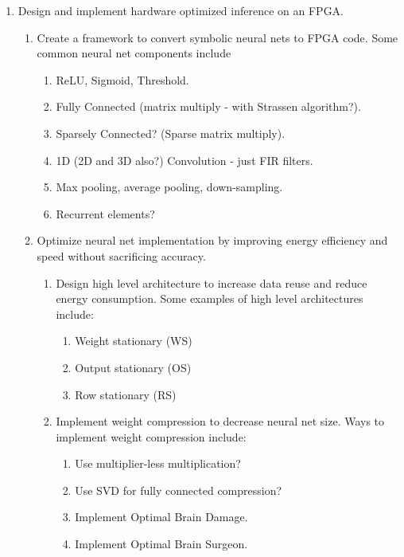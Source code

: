 \documentclass[12pt]{article}
\begin{document}
  \begin{enumerate}
  \item Design and implement hardware optimized inference on an FPGA.
    \begin{enumerate}
      \item Create a framework to convert symbolic neural nets to FPGA code. Some common neural net components include
        \begin{enumerate}
          \item ReLU, Sigmoid, Threshold.
          \item Fully Connected (matrix multiply - with Strassen algorithm?).
          \item Sparsely Connected? (Sparse matrix multiply).
          \item 1D (2D and 3D also?) Convolution - just FIR filters.
          \item Max pooling, average pooling, down-sampling.
          \item Recurrent elements?
        \end{enumerate}
      \item Optimize neural net implementation by improving energy efficiency and speed without sacrificing accuracy. 
      \begin{enumerate}
        \item Design high level architecture to increase data reuse and reduce energy consumption. Some examples of high level architectures include:
          \begin{enumerate}
              \item Weight stationary (WS) \cite{DBLP:journals/corr/SzeCYE17}
              \item Output stationary (OS) \cite{DBLP:journals/corr/SzeCYE17}
              \item Row stationary (RS) \cite{DBLP:journals/corr/SzeCYE17}
          \end{enumerate}
        \item Implement weight compression to decrease neural net size. Ways to implement weight compression include:
          \begin{enumerate}
            \item Use multiplier-less multiplication?
            \item Use SVD for fully connected compression?
            \item Implement Optimal Brain Damage. \cite{DBLP:conf/nips/CunDS89}
            \item Implement Optimal Brain Surgeon. \cite{DBLP:conf/nips/HassibiS92}

\end{enumerate}
\end{enumerate}
\end{enumerate}
\end{enumerate}
\end{document}

